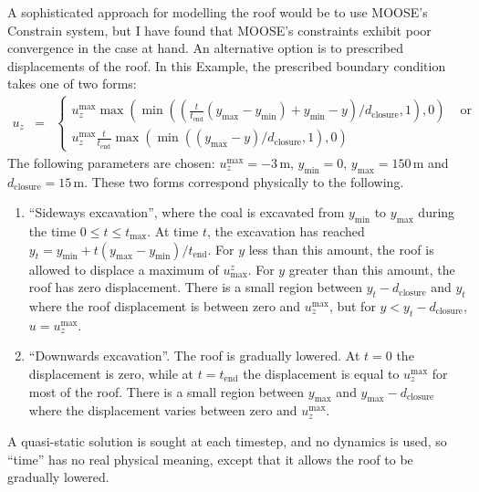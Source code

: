 \documentclass[]{scrreprt}
\begin{document}
A sophisticated approach for modelling the roof would be to use
MOOSE's Constrain system, but I have found that MOOSE's constraints
exhibit poor convergence in the case at hand.  An alternative option
is to prescribed displacements of the roof.  In this Example, the
prescribed boundary condition takes one of two forms:
\begin{eqnarray}
u_{z} & = & \left\{
\begin{array}{ll}
u_{z}^{\mathrm{max}} \max\left( \min\left( \left(
\frac{t}{t_{\mathrm{end}}}(y_{\mathrm{max}} - y_{\mathrm{min}}) +
y_{\mathrm{min}} - y \right) / d_{\mathrm{closure}}, 1 \right),
0\right) & \mbox{ or} \\
u_{z}^{\mathrm{max}} \frac{t}{t_{\mathrm{end}}} \max\left( \min\left(
(y_{\mathrm{max}} - y)/d_{\mathrm{closure}}, 1 \right), 0\right)
\end{array}
\right.
\end{eqnarray}
The following parameters are chosen: $u_{z}^{\mathrm{max}} = -3$\,m,
$y_{\mathrm{min}} = 0$, $y_{\mathrm{max}}=150$\,m and
$d_{\mathrm{closure}}=15$\,m.  These two forms correspond physically
to the following.
\begin{enumerate}
\item ``Sideways excavation'', where the coal is excavated from
  $y_{\mathrm{min}}$ to $y_{\mathrm{max}}$ during the time $0\leq
  t\leq t_{\mathrm{max}}$.  At time $t$, the excavation has reached $y_{t}
  = y_{\mathrm{min}} + t(y_{\mathrm{max}} -
    y_{\mathrm{min}})/t_{\mathrm{end}}$.  For $y$ less than this
    amount, the roof is allowed to displace a maximum
  of $u^{z}_{\mathrm{max}}$.  For $y$ greater than this amount, the
  roof has zero displacement.  There is a small region between
  $y_{t}-d_{\mathrm{closure}}$ and $y_{t}$ where the roof displacement
  is between zero and $u_{z}^{\mathrm{max}}$, but for
  $y<y_{t}-d_{\mathrm{closure}}$, $u = u_{z}^{\mathrm{max}}$.
\item ``Downwards excavation''.  The roof is gradually lowered.  At
  $t=0$ the displacement is zero, while at $t=t_{\mathrm{end}}$ the
  displacement is equal to $u_{z}^{\mathrm{max}}$ for most of the
  roof.  There is a small region between $y_{\mathrm{max}}$ and
  $y_{\mathrm{max}} - d_{\mathrm{closure}}$ where the displacement
  varies between zero and $u_{z}^{\mathrm{max}}$.
\end{enumerate}
A quasi-static solution is sought at each timestep, and no dynamics is
used, so ``time'' has no real physical meaning, except that it allows
the roof to be gradually lowered.
\end{document}
